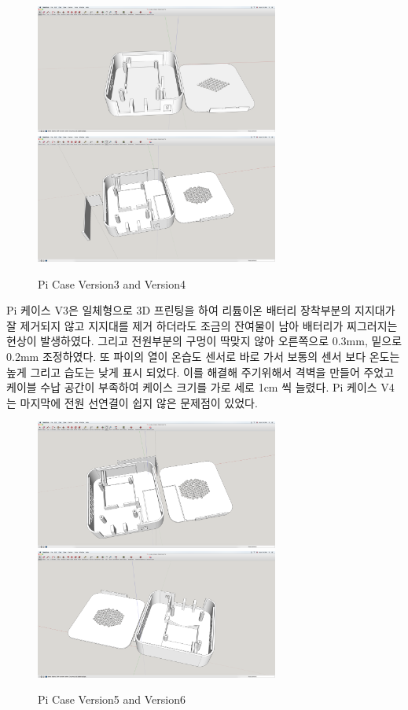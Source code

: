 \documentclass[11pt
  , a4paper
  , article
  , oneside
]{memoir}
\begin{document}
\begin{center}
	\begin{figure}[h]
		\includegraphics[width=8cm]{./images/V3.png}
		\includegraphics[width=8cm]{./images/V4.png}
		\caption{Pi Case Version3 and Version4}
	\end{figure}
\end{center}
Pi 케이스 V3은 일체형으로 3D 프린팅을 하여 리튬이온 배터리 장착부분의 지지대가 잘 제거되지 않고 지지대를 제거 하더라도 조금의 잔여물이 남아 배터리가 찌그러지는 현상이 발생하였다. 그리고 전원부분의 구멍이 딱맞지 않아 오른쪽으로 0.3mm, 밑으로 0.2mm 조정하였다. 또 파이의 열이 온습도 센서로 바로 가서 보통의 센서 보다 온도는 높게 그리고 습도는 낮게 표시 되었다. 이를 해결해 주기위해서 격벽을 만들어 주었고 케이블 수납 공간이 부족하여 케이스 크기를 가로 세로 1cm 씩 늘렸다.
Pi 케이스 V4는 마지막에 전원 선연결이 쉽지 않은 문제점이 있었다.
\begin{center}
	\begin{figure}[h]
		\includegraphics[width=8cm]{./images/V5.png}
		\includegraphics[width=8cm]{./images/V6.png}
		\caption{Pi Case Version5 and Version6}
	\end{figure}
\end{center}
\end{document}
